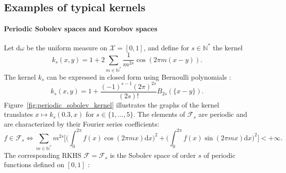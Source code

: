 \documentclass[twoside,11pt]{book}
\begin{document}
\subsection{Examples of typical kernels}
\label{subsec:kernel_examples}
\paragraph{Periodic Sobolev spaces and Korobov spaces}




Let $\mathrm{d}\omega$ be the uniform measure on $\mathcal{X} = [0,1]$, and define for $s \in \mathbb{N}^{*}$ the kernel
\begin{equation}
k_{s}(x,y) = 1+ 2\sum\limits_{m \in \mathbb{N}^{*}} \frac{1}{m^{2s}} \cos(2\pi m(x-y)).
\end{equation}
The kernel $k_{s}$ can be expressed in closed form using Bernoulli polynomials \cite{Wah90}:
\begin{equation}
k_{s}(x,y) = 1 + \frac{(-1)^{s-1}(2 \pi)^{2s}}{(2s)!} B_{2s}(\{x-y\}).
\end{equation}
Figure~\ref{fig:periodic_sobolev_kernel} illustrates the graphs of the kernel translates $x \mapsto k_{s}(0.3,x)$ for $s \in \{1, \dots, 5\}$. The elements of $\mathcal{F}_{s}$ are periodic and are characterized by their Fourier series coefficients:
\begin{equation}
f \in \mathcal{F}_{s} \iff \sum\limits_{m \in \mathbb{N}^{*}} m^{2s} \bigg[\big( \int_{0}^{2\pi} f(x)\cos (2 \pi m x) \mathrm{d}x \big)^{2} + \big( \int_{0}^{2\pi} f(x)\sin (2 \pi m x) \mathrm{d}x \big)^{2} \bigg] <+\infty .
\end{equation}
The corresponding RKHS $\mathcal{F}=\mathcal{F}_{s}$ is the Sobolev space of order $s$ of periodic functions defined on $[0,1]$ \citep{BeTh11}:
\end{document}
